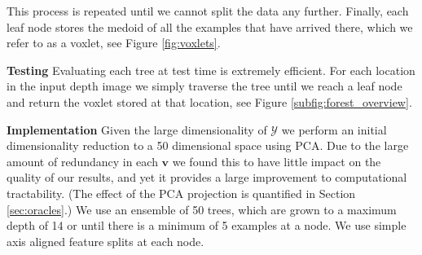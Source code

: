 \documentclass[10pt,twocolumn,letterpaper]{article}
\renewcommand{\paragraph}{\vspace{2pt}\noindent\textbf}
\begin{document}
This process is repeated until we cannot split the data any further.
Finally, each leaf node stores the medoid of all the examples that have arrived there, which we refer to as a voxlet, see Figure \ref{fig:voxlets}.


\paragraph{Testing}
Evaluating each tree at test time is extremely efficient.
For each location in the input depth image we simply traverse the tree until we reach a leaf node and return the voxlet stored at that location, see Figure \ref{subfig:forest_overview}.

\paragraph{Implementation}
Given the large dimensionality of $\mathcal{Y}$ we perform an initial dimensionality reduction to a 50 dimensional space using PCA.
Due to the large amount of redundancy in each $\mathbf{v}$ we found this to have little impact on the quality of our results, and yet it provides a large improvement to computational tractability.
(The effect of the PCA projection is quantified in Section \ref{sec:oracles}.)
We use an ensemble of 50 trees, which are grown to a maximum depth of 14 or until there is a minimum of 5 examples at a node.
We use simple axis aligned feature splits at each node.
\end{document}

